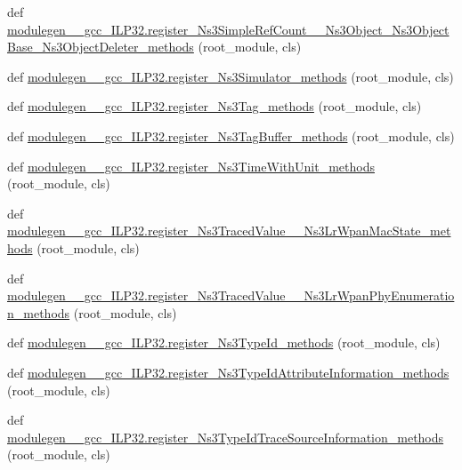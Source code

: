 \begin{DoxyCompactItemize}
\item 
def \hyperlink{namespacemodulegen____gcc__ILP32_ac5f5e4798fdbd14c15d133fdd259a2e0}{modulegen\+\_\+\+\_\+gcc\+\_\+\+I\+L\+P32.\+register\+\_\+\+Ns3\+Simple\+Ref\+Count\+\_\+\+\_\+\+Ns3\+Object\+\_\+\+Ns3\+Object\+Base\+\_\+\+Ns3\+Object\+Deleter\+\_\+methods} (root\+\_\+module, cls)
\item 
def \hyperlink{namespacemodulegen____gcc__ILP32_aa549fc85b0feec2f8115e70db4c26c2a}{modulegen\+\_\+\+\_\+gcc\+\_\+\+I\+L\+P32.\+register\+\_\+\+Ns3\+Simulator\+\_\+methods} (root\+\_\+module, cls)
\item 
def \hyperlink{namespacemodulegen____gcc__ILP32_a5578ddbed750d0c575df9ed36c4d86d6}{modulegen\+\_\+\+\_\+gcc\+\_\+\+I\+L\+P32.\+register\+\_\+\+Ns3\+Tag\+\_\+methods} (root\+\_\+module, cls)
\item 
def \hyperlink{namespacemodulegen____gcc__ILP32_a24ac4bbf908e2dfdea2eca022c057906}{modulegen\+\_\+\+\_\+gcc\+\_\+\+I\+L\+P32.\+register\+\_\+\+Ns3\+Tag\+Buffer\+\_\+methods} (root\+\_\+module, cls)
\item 
def \hyperlink{namespacemodulegen____gcc__ILP32_a8942fb893268c4774333e3a81c3cf7d3}{modulegen\+\_\+\+\_\+gcc\+\_\+\+I\+L\+P32.\+register\+\_\+\+Ns3\+Time\+With\+Unit\+\_\+methods} (root\+\_\+module, cls)
\item 
def \hyperlink{namespacemodulegen____gcc__ILP32_a626d84bbe9e306707789015422d88585}{modulegen\+\_\+\+\_\+gcc\+\_\+\+I\+L\+P32.\+register\+\_\+\+Ns3\+Traced\+Value\+\_\+\+\_\+\+Ns3\+Lr\+Wpan\+Mac\+State\+\_\+methods} (root\+\_\+module, cls)
\item 
def \hyperlink{namespacemodulegen____gcc__ILP32_a4cede0770ecb228bf75e594d427219e5}{modulegen\+\_\+\+\_\+gcc\+\_\+\+I\+L\+P32.\+register\+\_\+\+Ns3\+Traced\+Value\+\_\+\+\_\+\+Ns3\+Lr\+Wpan\+Phy\+Enumeration\+\_\+methods} (root\+\_\+module, cls)
\item 
def \hyperlink{namespacemodulegen____gcc__ILP32_a6436195ea7813af4a6f5611bac15066d}{modulegen\+\_\+\+\_\+gcc\+\_\+\+I\+L\+P32.\+register\+\_\+\+Ns3\+Type\+Id\+\_\+methods} (root\+\_\+module, cls)
\item 
def \hyperlink{namespacemodulegen____gcc__ILP32_afa4c5c57202d38b0cdfa0d7fd58b5797}{modulegen\+\_\+\+\_\+gcc\+\_\+\+I\+L\+P32.\+register\+\_\+\+Ns3\+Type\+Id\+Attribute\+Information\+\_\+methods} (root\+\_\+module, cls)
\item 
def \hyperlink{namespacemodulegen____gcc__ILP32_a839bc77808351c50cde37c45869c9ac2}{modulegen\+\_\+\+\_\+gcc\+\_\+\+I\+L\+P32.\+register\+\_\+\+Ns3\+Type\+Id\+Trace\+Source\+Information\+\_\+methods} (root\+\_\+module, cls)

\end{DoxyCompactItemize}

